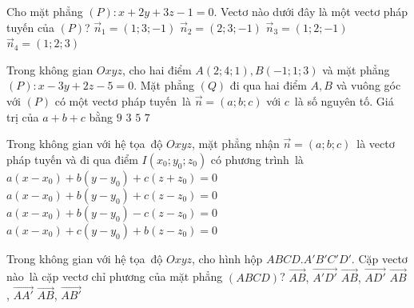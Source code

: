 \begin{ex}%
	Cho mặt phẳng $(P)\colon x+2 y+3 z-1=0$. Vectơ nào dưới đây là một vectơ  pháp tuyến của $(P)$?
	 \choice
		{$\overrightarrow{n}_1=(1;  3;-1)$}
		{$\overrightarrow{n}_2=(2; 3;-1)$} 
		{$\overrightarrow{n}_3=(1;  2;-1)$}
		{\True  $\overrightarrow{n}_4=(1; 2; 3)$}
\end{ex}

\begin{ex}%
	Trong không gian $Oxyz$, cho hai điểm  $A(2;4;1), B(-1;1;3)$ và mặt phẳng \break $(P) \colon x-3y+2z-5=0$. Mặt phẳng $(Q)$ đi qua hai điểm $A, B$ và vuông góc với $(P)$ có một vectơ pháp tuyến~là $\overrightarrow{n}=(a;b;c)$ với $c$~là số nguyên tố. Giá trị của $a+b+c$ bằng
	 \choice
		{$9$} 
		{$3$} 
		{\True $5$} 
		 {$7$}
\end{ex}

\begin{ex}%
	Trong không gian với hệ tọa~độ $Oxyz$, mặt phẳng nhận $\overrightarrow{n}=\left(a;b;c \right)$~là vectơ pháp tuyến và đi  qua điểm $I\left({{x}_0};{{y}_0};{{z}_0} \right)$ có phương trình~là
	 \choice
		{$a\left(x-{{x}_0} \right)+b\left(y-{{y}_0}  \right)+c\left(z+{{z}_0} \right)=0$}
		{\True $a\left(x-{{x}_0} \right)+b\left(y-{{y}_0} \right)+c\left(z-{{z}_0}  \right)=0$}
		{$a\left(x-{{x}_0} \right)+b\left(y-{{y}_0}  \right)-c\left(z-{{z}_0} \right)=0$}
		 {$a\left(x-{{x}_0} \right)+c\left(y-{{y}_0} \right)+b\left(z-{{z}_0} \right)=0$}
\end{ex}

\begin{ex}%
	Trong không gian với hệ tọa~độ $Oxyz$, cho hình hộp $ABCD.A'B'C'D'$. Cặp vectơ nào~là cặp vectơ chỉ  phương của mặt phẳng $\left(ABCD \right)$?
	 \choice
		{\True$\overrightarrow{AB}$,  $\overrightarrow{A'D'}$}
		{$\overrightarrow{AB}$,  $\overrightarrow{AD'}$}
		{$\overrightarrow{AB}$, $\overrightarrow{AA'}$} 
		 {$\overrightarrow{AB}$, $\overrightarrow{AB'}$}
\end{ex}

